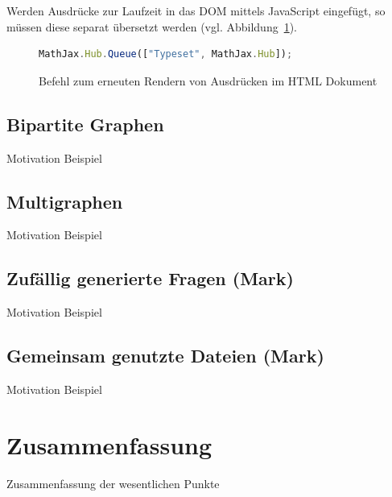 Werden Ausdrücke zur Laufzeit in das DOM mittels JavaScript eingefügt, so müssen diese separat übersetzt werden (vgl. Abbildung~\ref{fig:listing-mathjax-render}).

\begin{figure}[h!]
\begin{lstlisting}[language=JavaScript]
MathJax.Hub.Queue(["Typeset", MathJax.Hub]);
\end{lstlisting}
\caption[MathJAX Rendern]{Befehl zum erneuten Rendern von Ausdrücken im HTML Dokument}\label{fig:listing-mathjax-render}
\end{figure}

\section{Bipartite Graphen}
Motivation
Beispiel

\section{Multigraphen}
Motivation
Beispiel

\section{Zufällig generierte Fragen (Mark)}
Motivation
Beispiel

\section{Gemeinsam genutzte Dateien (Mark)}
Motivation
Beispiel

\chapter{Zusammenfassung}
Zusammenfassung der wesentlichen Punkte
